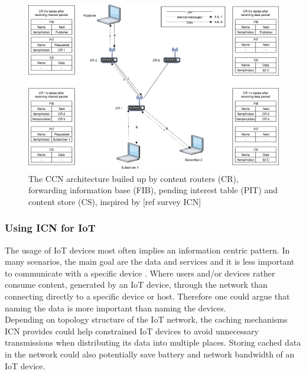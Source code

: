 \begin{figure}
	\includegraphics[width=\textwidth]{figures/CCN-architecture.png}
	\caption{The CCN architecture builed up by content routers (CR), forwarding information base (FIB), pending interest table (PIT) and content store (CS), inspired by [ref survey ICN]}
	\label{fig:CCN-architecture}
\end{figure}



\subsubsection{Using ICN for IoT}
The usage of IoT devices most often implies an information centric pattern. In many scenarios, the main goal are the data and services and it is less important to communicate with a specific device \cite{Ahlgreniot}. Where users and/or devices rather consume content, generated by an IoT device, through the network than connecting directly to a specific device or host. Therefore one could argue that naming the data is more important than naming the devices.\\
Depending on topology structure of the IoT network, the caching mechanisms ICN provides could help constrained IoT devices to avoid unnecessary transmissions when distributing its data into multiple places. Storing cached data in the network could also potentially save battery and network bandwidth of an IoT device.




